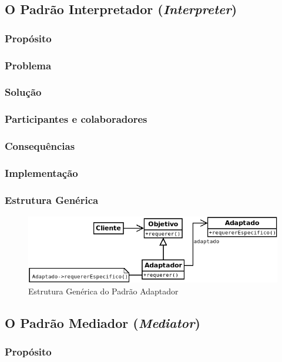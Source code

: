 \subsection{O Padrão Interpretador (\textit{Interpreter})}
\subsubsection{Propósito}
\subsubsection{Problema}
\subsubsection{Solução}
\subsubsection{Participantes e colaboradores}
\subsubsection{Consequências}
\subsubsection{Implementação}
\subsubsection{Estrutura Genérica}

\begin{figure}[h]
\begin{center}
\includegraphics[scale=0.6]{adaptador.png}
\caption{Estrutura Genérica do Padrão Adaptador}\label{fig:adaptador}
\end{center}
\end{figure}

\subsection{O Padrão Mediador (\textit{Mediator})}
\subsubsection{Propósito}
